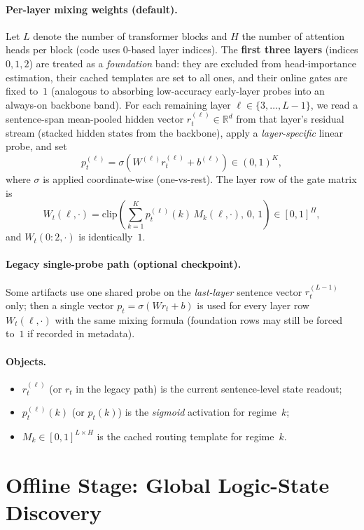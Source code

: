 \documentclass[11pt]{article}
\begin{document}
\paragraph{Per-layer mixing weights (default).}
Let $L$ denote the number of transformer blocks and $H$ the number of attention heads per block (code uses $0$-based layer indices). The \textbf{first three layers} (indices $0,1,2$) are treated as a \emph{foundation} band: they are excluded from head-importance estimation, their cached templates are set to all ones, and their online gates are fixed to~$1$ (analogous to absorbing low-accuracy early-layer probes into an always-on backbone band). For each remaining layer $\ell\in\{3,\dots,L-1\}$, we read a sentence-span mean-pooled hidden vector $r_t^{(\ell)}\in\mathbb{R}^d$ from that layer's residual stream (stacked hidden states from the backbone), apply a \emph{layer-specific} linear probe, and set
\[
p_t^{(\ell)} = \sigma\!\left(W^{(\ell)} r_t^{(\ell)} + b^{(\ell)}\right)\in (0,1)^K,
\]
where $\sigma$ is applied coordinate-wise (one-vs-rest). The layer row of the gate matrix is
\[
W_t(\ell,\cdot) = \mathrm{clip}\!\left(\sum_{k=1}^{K} p_t^{(\ell)}(k)\, M_k(\ell,\cdot),\, 0,\, 1\right)\in[0,1]^H,
\]
and $W_t(0\!:\!2,\cdot)$ is identically~$1$.

\paragraph{Legacy single-probe path (optional checkpoint).}
Some artifacts use one shared probe on the \emph{last-layer} sentence vector $r_t^{(L-1)}$ only; then a single vector $p_t=\sigma(W r_t+b)$ is used for every layer row $W_t(\ell,\cdot)$ with the same mixing formula (foundation rows may still be forced to~$1$ if recorded in metadata).

\paragraph{Objects.}
\begin{itemize}[leftmargin=1.5em]
    \item $r_t^{(\ell)}$ (or $r_t$ in the legacy path) is the current sentence-level state readout;
    \item $p_t^{(\ell)}(k)$ (or $p_t(k)$) is the \emph{sigmoid} activation for regime~$k$;
    \item $M_k\in[0,1]^{L\times H}$ is the cached routing template for regime~$k$.
\end{itemize}

\section{Offline Stage: Global Logic-State Discovery}
\end{document}
